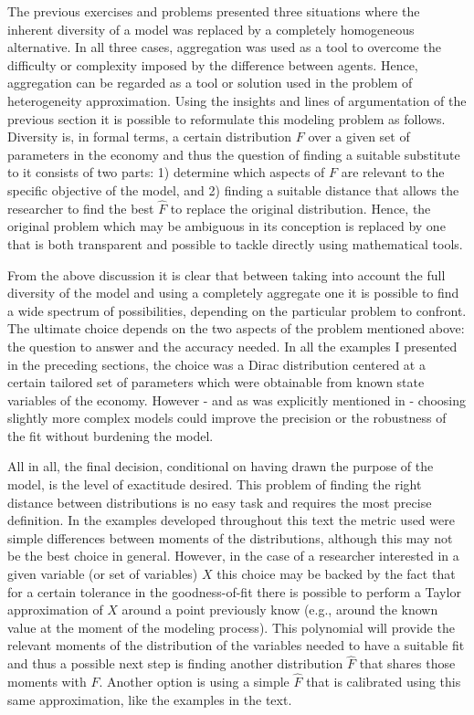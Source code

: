 \documentclass[english, a4paper,12pt]{article}
\begin{document}
The previous exercises and problems presented three situations where the inherent diversity of a model was replaced by a completely homogeneous alternative. In all three cases, aggregation was used as a tool to overcome the difficulty or complexity imposed by the difference between agents. Hence, aggregation can be regarded as a tool or solution used in the problem of heterogeneity approximation. Using the insights and lines of argumentation of the previous section it is possible to reformulate this modeling problem as follows. Diversity is, in formal terms, a certain distribution $F$ over a given set of parameters in the economy and thus the question of finding a suitable substitute to it consists of two parts: 1) determine which aspects of $F$ are relevant to the specific objective of the model, and 2) finding a suitable distance that allows the researcher to find the best $\hat{F}$ to replace the original distribution. Hence, the original problem which may be ambiguous in its conception is replaced by one that is both transparent and possible to tackle directly using mathematical tools. 

From the above discussion it is clear that between taking into account the full diversity of the model and using a completely aggregate one it is possible to find a wide spectrum of possibilities, depending on the particular problem to confront. The ultimate choice depends on the two aspects of the problem mentioned above: the question to answer and the accuracy needed. In all the examples I presented in the preceding sections, the choice was a Dirac distribution centered at a certain tailored set of parameters which were obtainable from known state variables of the economy. However - and as was explicitly mentioned in  - choosing slightly more complex models could improve the precision or the robustness of the fit without burdening the model.

All in all, the final decision, conditional on having drawn the purpose of the model, is the level of exactitude desired. This problem of finding the right distance between distributions is no easy task and requires the most precise definition. In the examples developed throughout this text the metric used were simple differences between moments of the distributions, although this may not be the best choice in general. However, in the case of a researcher interested in a given variable (or set of variables) $X$ this choice may be backed by the fact that for a certain tolerance in the goodness-of-fit there is possible to perform a Taylor approximation of $X$ around a point previously know (e.g., around the known value at the moment of the modeling process). This polynomial will provide the relevant moments of the distribution of the variables needed to have a suitable fit and thus a possible next step is finding another distribution $\hat{F}$ that shares those moments with $F$. Another option is using a simple $\hat{F}$ that is calibrated using this same approximation, like the examples in the text.
\end{document}
